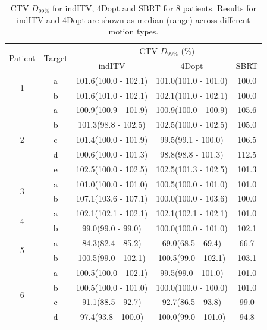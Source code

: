 \begin{table}[H]
	\centering
	\caption{CTV $D_{99\%}$ for indITV, 4Dopt and SBRT for 8 patients. Results for indITV and 4Dopt are shown as median (range) across different motion types.}
	\begin{tabular}{c|c|c|c|c}
		\hline\hline
		\multirow{2}{*}{Patient} & \multirow{2}{*}{Target} & \multicolumn{3}{|c}{CTV $D_{99\%}$ (\%)}  \\
		 &  & indITV & 4Dopt & SBRT \\
		 \hline
		 
\multirow{2}{*}{1} & a & 101.6(100.0 - 102.1) & 101.0(101.0 - 101.0) & 100.0\\ 
 & b & 101.6(101.0 - 102.1) & 102.1(101.0 - 102.1) & 100.0\\ 
\hline

\multirow{5}{*}{2} & a & 100.9(100.9 - 101.9) & 100.9(100.0 - 100.9) & 105.6\\ 
 & b & 101.3(98.8 - 102.5) & 102.5(100.0 - 102.5) & 105.0\\ 
 & c & 101.4(100.0 - 101.9) & 99.5(99.1 - 100.0) & 106.5\\ 
 & d & 100.6(100.0 - 101.3) & 98.8(98.8 - 101.3) & 112.5\\ 
 & e & 102.5(100.0 - 102.5) & 102.5(101.3 - 102.5) & 101.3\\ 
\hline

\multirow{2}{*}{3} & a & 101.0(100.0 - 101.0) & 100.5(100.0 - 101.0) & 101.0\\ 
 & b & 107.1(103.6 - 107.1) & 100.0(100.0 - 103.6) & 100.0\\ 
\hline

\multirow{2}{*}{4} & a & 102.1(102.1 - 102.1) & 102.1(102.1 - 102.1) & 101.0\\ 
 & b & 99.0(99.0 - 99.0) & 100.0(100.0 - 101.0) & 102.1\\ 
\hline

\multirow{2}{*}{5} & a & 84.3(82.4 - 85.2) & 69.0(68.5 - 69.4) & 66.7\\ 
 & b & 100.5(99.0 - 102.1) & 100.5(99.0 - 102.1) & 103.1\\ 
\hline

\multirow{4}{*}{6} & a & 100.5(100.0 - 102.1) & 99.5(99.0 - 101.0) & 101.0\\ 
 & b & 100.5(100.0 - 101.0) & 100.0(100.0 - 100.0) & 101.0\\ 
 & c & 91.1(88.5 - 92.7) & 92.7(86.5 - 93.8) & 99.0\\ 
 & d & 97.4(93.8 - 100.0) & 100.0(99.0 - 101.0) & 94.8\\ 
\hline


\end{tabular}
\end{table}
